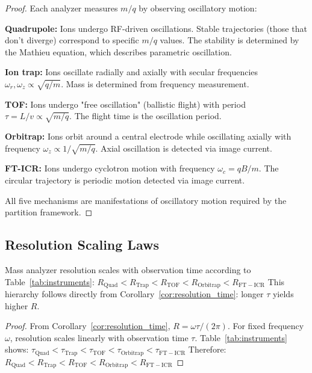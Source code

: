 \begin{proof}
Each analyzer measures $m/q$ by observing oscillatory motion:

\textbf{Quadrupole:} Ions undergo RF-driven oscillations. Stable trajectories (those that don't diverge) correspond to specific $m/q$ values. The stability is determined by the Mathieu equation, which describes parametric oscillation.

\textbf{Ion trap:} Ions oscillate radially and axially with secular frequencies $\omega_r, \omega_z \propto \sqrt{q/m}$. Mass is determined from frequency measurement.

\textbf{TOF:} Ions undergo "free oscillation" (ballistic flight) with period $\tau = L/v \propto \sqrt{m/q}$. The flight time is the oscillation period.

\textbf{Orbitrap:} Ions orbit around a central electrode while oscillating axially with frequency $\omega_z \propto 1/\sqrt{m/q}$. Axial oscillation is detected via image current.

\textbf{FT-ICR:} Ions undergo cyclotron motion with frequency $\omega_c = qB/m$. The circular trajectory is periodic motion detected via image current.

All five mechanisms are manifestations of oscillatory motion required by the partition framework.
\end{proof}



\subsection{Resolution Scaling Laws}

\begin{proposition}
\label{prop:resolution_hierarchy}
Mass analyzer resolution scales with observation time according to Table~\ref{tab:instruments}:
$
R_{\mathrm{Quad}} < R_{\mathrm{Trap}} < R_{\mathrm{TOF}} < R_{\mathrm{Orbitrap}} < R_{\mathrm{FT-ICR}}
$
This hierarchy follows directly from Corollary~\ref{cor:resolution_time}: longer $\tau$ yields higher $R$.
\end{proposition}

\begin{proof}
From Corollary~\ref{cor:resolution_time}, $R = \omega\tau/(2\pi)$. For fixed frequency $\omega$, resolution scales linearly with observation time $\tau$. Table~\ref{tab:instruments} shows:
$
\tau_{\mathrm{Quad}} < \tau_{\mathrm{Trap}} < \tau_{\mathrm{TOF}} < \tau_{\mathrm{Orbitrap}} < \tau_{\mathrm{FT-ICR}}
$
Therefore:
$
R_{\mathrm{Quad}} < R_{\mathrm{Trap}} < R_{\mathrm{TOF}} < R_{\mathrm{Orbitrap}} < R_{\mathrm{FT-ICR}}
$
\end{proof}

